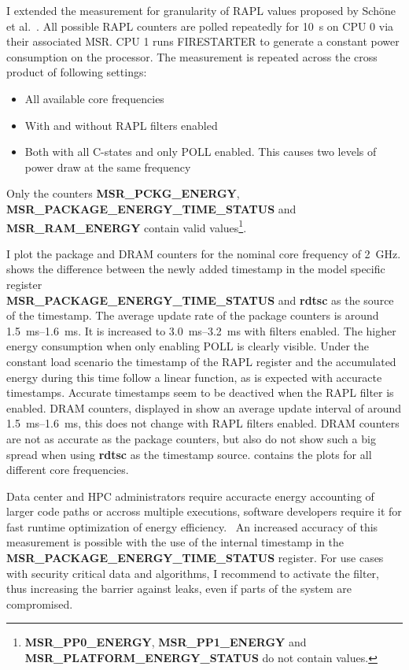 I extended the measurement for granularity of \ac{RAPL} values proposed by Schöne et al.~\cite{Schoene_2024_Alder_Lake}.
All possible \ac{RAPL} counters are polled repeatedly for \SI{10}{\s} on CPU 0 via their associated MSR.
CPU 1 runs FIRESTARTER to generate a constant power consumption on the processor.
The measurement is repeated across the cross product of following settings:
\begin{itemize}
    \item All available core frequencies
    \item With and without \ac{RAPL} filters enabled
    \item Both with all C-states and only POLL enabled.
    This causes two levels of power draw at the same frequency
\end{itemize}
Only the counters \textbf{MSR\_PCKG\_ENERGY}, \textbf{MSR\_PACKAGE\_ENERGY\_TIME\_STATUS} and\\ \textbf{MSR\_RAM\_ENERGY} contain valid values\footnote{\textbf{MSR\_PP0\_ENERGY}, \textbf{MSR\_PP1\_ENERGY} and \textbf{MSR\_PLATFORM\_ENERGY\_STATUS} do not contain values.}.

I plot the package and \ac{DRAM} counters for the nominal core frequency of \SI{2}{\GHz}.
 shows the difference between the newly added timestamp in the model specific register\\ \textbf{MSR\_PACKAGE\_ENERGY\_TIME\_STATUS} and \textbf{rdtsc} as the source of the timestamp.
The average update rate of the package counters is around \SI{1.5}{\ms}--\SI{1.6}{\ms}.
It is increased to \SI{3.0}{\ms}--\SI{3.2}{\ms} with filters enabled.
The higher energy consumption when only enabling POLL is clearly visible.
Under the constant load scenario the timestamp of the \ac{RAPL} register and the accumulated energy during this time follow a linear function, as is expected with accuracte timestamps.
Accurate timestamps seem to be deactived when the \ac{RAPL} filter is enabled.
\ac{DRAM} counters, displayed in  show an average update interval of around \SI{1.5}{\ms}--\SI{1.6}{\ms}, this does not change with \ac{RAPL} filters enabled.
\ac{DRAM} counters are not as accurate as the package counters, but also do not show such a big spread when using \textbf{rdtsc} as the timestamp source.
 contains the plots for all different core frequencies.

Data center and \ac{HPC} administrators require accuracte energy accounting of larger code paths or accross multiple executions, software developers require it for fast runtime optimization of energy efficiency.~\cite{Gocht_2019_QLearning,Haehnel_2012_RAPL}
An increased accuracy of this measurement is possible with the use of the internal timestamp in the \textbf{MSR\_PACKAGE\_ENERGY\_TIME\_STATUS} register.
For use cases with security critical data and algorithms, I recommend to activate the filter, thus increasing the barrier against leaks, even if parts of the system are compromised.

